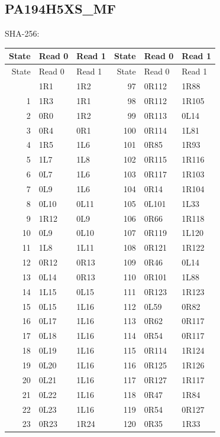\subsection{PA194H5XS\_MF}
\noindent\footnotesize SHA-256: \par
\begingroup\small\setlength{\tabcolsep}{12pt}
\begin{longtable}{rll@{\qquad}rll}
\toprule State & Read 0 & Read 1 & State & Read 0 & Read 1\\
\midrule\endfirsthead
\toprule State & Read 0 & Read 1 & State & Read 0 & Read 1\\
\midrule\endhead
\bottomrule\endfoot
0 & 1R1 & 1R2 & 97 & 0R112 & 1R88\\
1 & 1R3 & 1R1 & 98 & 0R112 & 1R105\\
2 & 0R0 & 1R2 & 99 & 0R113 & 0L14\\
3 & 0R4 & 0R1 & 100 & 0R114 & 1L81\\
4 & 1R5 & 1L6 & 101 & 0R85 & 1R93\\
5 & 1L7 & 1L8 & 102 & 0R115 & 1R116\\
6 & 0L7 & 1L6 & 103 & 0R117 & 1R103\\
7 & 0L9 & 1L6 & 104 & 0R14 & 1R104\\
8 & 0L10 & 0L11 & 105 & 0L101 & 1L33\\
9 & 1R12 & 0L9 & 106 & 0R66 & 1R118\\
10 & 0L9 & 0L10 & 107 & 0R119 & 1L120\\
11 & 1L8 & 1L11 & 108 & 0R121 & 1R122\\
12 & 0R12 & 0R13 & 109 & 0R46 & 0L14\\
13 & 0L14 & 0R13 & 110 & 0R101 & 1L88\\
14 & 1L15 & 0L15 & 111 & 0R123 & 1R123\\
15 & 0L15 & 1L16 & 112 & 0L59 & 0R82\\
16 & 0L17 & 1L16 & 113 & 0R62 & 0R117\\
17 & 0L18 & 1L16 & 114 & 0R54 & 0R117\\
18 & 0L19 & 1L16 & 115 & 0R114 & 1R124\\
19 & 0L20 & 1L16 & 116 & 0R125 & 1R126\\
20 & 0L21 & 1L16 & 117 & 0R127 & 1R117\\
21 & 0L22 & 1L16 & 118 & 0R47 & 1R84\\
22 & 0L23 & 1L16 & 119 & 0R54 & 0R127\\
23 & 0R23 & 1R24 & 120 & 0R35 & 1R33\\

\end{longtable}
